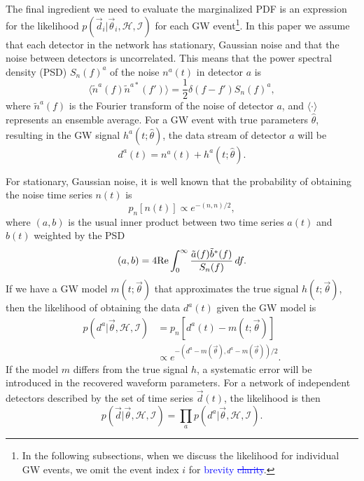 \documentclass[twocolumn,prd,amssymb,aps,nofootinbib,showpacs,epsf]{revtex4}
\newcommand\les[2]{\textcolor{blue}{{#1}\sout{#2}}}
\begin{document}
The final ingredient we need to evaluate the marginalized PDF is an expression for the likelihood $p(\vec d_i | \vec\theta_i,\mathcal{H},\mathcal{I})$ for each GW event\footnote{In the following subsections, when we discuss the likelihood for individual GW events, we omit the event index $i$ for \les{brevity }{clarity}.}. In this paper we assume that each detector in the network has stationary, Gaussian noise and that the noise between detectors is uncorrelated. This means that the power spectral density (PSD) $S_n(f)^a$ of the noise $n^a(t)$ in detector $a$ is
\begin{equation}
\langle \tilde n^a(f) \tilde n^{a*}(f') \rangle = \frac{1}{2} \delta (f-f') S_n(f)^a,
\end{equation}
where $\tilde n^a(f)$ is the Fourier transform of the noise of detector $a$, and $\langle\cdot\rangle$ represents an ensemble average. For a GW event with true parameters $\hat\theta$, resulting in the GW signal $h^a(t; \hat\theta)$, the data stream of detector $a$ will be
\begin{equation}
d^a(t) = n^a(t) + h^a(t; \hat\theta).
\end{equation}

For stationary, Gaussian noise, it is well known that the probability of obtaining the noise time series $n(t)$ is
\begin{equation}
p_n[n(t)] \propto e^{-(n, n)/2},
\end{equation}
where $(a, b)$ is the usual inner product between two time series $a(t)$ and $b(t)$ weighted by the PSD
\begin{equation}
(a, b)=4{\rm Re} \int_0^\infty \frac{\tilde a(f) \tilde b^*(f)}{S_n(f)}\,df.
\end{equation}
If we have a GW model $m(t;\vec\theta)$ that approximates the true signal $h(t;\vec\theta)$, then the likelihood of obtaining the data $d^a(t)$ given the GW model is
\begin{align}
p(d^a | \vec\theta, \mathcal{H}, \mathcal{I}) &= p_n[d^a(t)-m(t; \vec\theta)] \nonumber\\
& \propto e^{-(d^a - m(\vec\theta), d^a - m(\vec\theta))/2}.
\end{align}
If the model $m$ differs from the true signal $h$, a systematic error will be introduced in the recovered waveform parameters. For a network of independent detectors described by the set of time series $\vec d(t)$, the likelihood is then
\begin{equation}
p(\vec d | \vec\theta, \mathcal{H}, \mathcal{I}) = \prod_a p(d^a | \vec\theta, \mathcal{H}, \mathcal{I}).
\end{equation}
\end{document}
